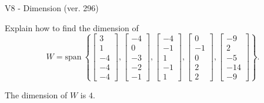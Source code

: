 \begin{exercise}
  \begin{exerciseTitle}V8 - Dimension (ver. 296)\end{exerciseTitle}
  \begin{exerciseStatement}
    Explain how to find the dimension of 
\[W=\mathrm{span}\ \left\{\left[\begin{array}{r}
3 \\
1 \\
-4 \\
-4 \\
-4
\end{array}\right] , \left[\begin{array}{r}
-4 \\
0 \\
-3 \\
-2 \\
-1
\end{array}\right] , \left[\begin{array}{r}
-4 \\
-1 \\
1 \\
-1 \\
1
\end{array}\right] , \left[\begin{array}{r}
0 \\
-1 \\
0 \\
2 \\
2
\end{array}\right] , \left[\begin{array}{r}
-9 \\
2 \\
-5 \\
-14 \\
-9
\end{array}\right]\right\}.\]



  \end{exerciseStatement}
  \begin{exerciseAnswer}
   The dimension of \(W\) is  \(4\).
  


  \end{exerciseAnswer}
\end{exercise}